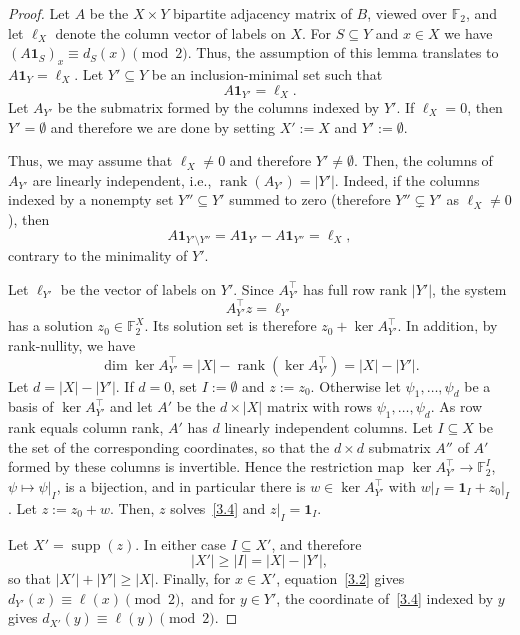 \documentclass[11pt]{article}
\theoremstyle{definition}
\theoremstyle{remark}
\newcommand{\supp}{\operatorname{supp}}
\newcommand{\rank}{\operatorname{rank}}
\newcommand{\F}{\mathbb{F}}
\newcommand{\1}{\mathbf{1}}
\begin{document}
	\begin{proof}
		Let $A$ be the $X\times Y$ bipartite adjacency matrix of $B$, viewed over
		$\F_2$, and let $\ell_X$ denote the column vector of labels on $X$.  For $S\subseteq Y$ and
		$x\in X$ we have $(A\1_S)_x\equiv d_S(x)\pmod 2$. Thus, the assumption of this lemma translates to $A\mathbf 1_Y=\ell_X$.
		Let $Y'\subseteq Y$ be an inclusion-minimal set such that
		\begin{equation}\label{3.2}
			A\mathbf 1_{Y'}=\ell_X.
		\end{equation}
        Let $A_{Y'}$ be the submatrix formed by the columns indexed
		by $Y'$. If $\ell_X=0$, then $Y'=\emptyset$ and therefore we are done by setting $X':=X$ and $Y':=\emptyset$. 
		
		Thus, we may assume that $\ell_X\neq 0$ and therefore $Y'\neq \emptyset$. Then, the columns of $A_{Y'}$ are linearly independent, i.e., $\rank(A_{Y'})=|Y'|$. Indeed, if the columns indexed by a nonempty set $Y''\subseteq Y'$ summed to zero (therefore $Y''\subsetneq Y'$ as $\ell_X\neq 0$), then
		\[
		A\mathbf 1_{Y'\setminus Y''}
		=A\mathbf 1_{Y'}-A\mathbf 1_{Y''}
		=\ell_X,
		\]
		contrary to the minimality of $Y'$.  
		
		Let $\ell_{Y'}$ be the vector of labels on $Y'$.  Since $A_{Y'}^{\top}$ has full row
		rank $|Y'|$, the system
		\begin{equation}\label{3.4}
			A_{Y'}^{\top} z=\ell_{Y'} 
		\end{equation}
		has a solution $z_0\in\F_2^X$.  Its solution set is therefore $z_0+\ker A_{Y'}^{\top}$. In addition, by rank-nullity, we have
	\[
			\dim \ker A_{Y'}^{\top}=|X|-\rank (\ker A_{Y'}^{\top})=|X|-|Y'| . \]
		Let $d=|X|-|Y'|$.  If $d=0$, set $I:=\emptyset$ and $z:=z_0$.  Otherwise let $\psi_1,\dots,\psi_d$ be a basis of $\ker A_{Y'}^{\top}$ and let $A'$ be the $d\times |X|$ matrix with rows $\psi_1,\dots,\psi_d$.  As row rank equals column rank, $A'$ has $d$ linearly independent columns. Let $I\subseteq X$ be the set of the corresponding coordinates, so that the $d\times d$ submatrix $A''$ of $A'$ formed by these columns is invertible.  Hence the restriction map $\ker A_{Y'}^{\top}\to\F_2^{I}$, $\psi\mapsto \psi|_I$, is a bijection, and in particular there is $w\in \ker A_{Y'}^{\top}$ with $w|_I=\1_I+z_0|_I$.  Let $z:=z_0+w$. Then, $z$ solves~\eqref{3.4} and $z|_I=\1_I$.
		
		Let $X'=\supp (z)$.  In either case $I\subseteq X'$, and therefore
		\[
			|X'|\ge |I|=|X|-|Y'|, 
		\]
		so that $|X'|+|Y'|\ge |X|$.  Finally, for $x\in X'$, equation~\eqref{3.2} gives
		$
		d_{Y'}(x)\equiv \ell(x)\pmod 2,
		$
		and for $y\in Y'$, the coordinate of~\eqref{3.4} indexed by $y$ gives
		$
		d_{X'}(y)\equiv \ell(y)\pmod 2.
		$
	\end{proof}
	
\end{document}
